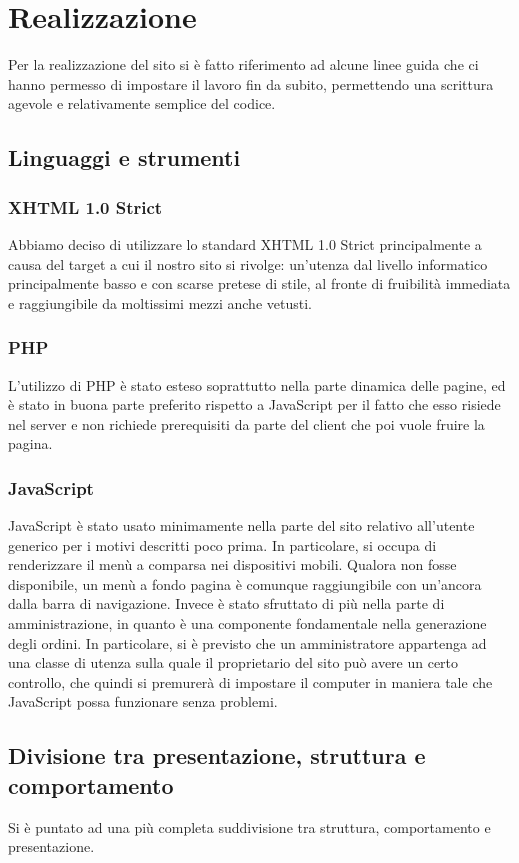 \newpage
\section{Realizzazione}
Per la realizzazione del sito si è fatto riferimento ad alcune linee guida che ci hanno permesso di impostare il lavoro fin da subito, permettendo una scrittura agevole e relativamente semplice del codice.
\subsection{Linguaggi e strumenti}
\subsubsection{XHTML 1.0 Strict}
Abbiamo deciso di utilizzare lo standard XHTML 1.0 Strict principalmente a causa del target a cui il nostro sito si rivolge: un'utenza dal livello informatico principalmente basso e con scarse pretese di stile, al fronte di fruibilità immediata e raggiungibile da moltissimi mezzi anche vetusti.
\subsubsection{PHP}
L'utilizzo di PHP è stato esteso soprattutto nella parte dinamica delle pagine, ed è stato in buona parte preferito rispetto a JavaScript per il fatto che esso risiede nel server e non richiede prerequisiti da parte del client che poi vuole fruire la pagina.
\subsubsection{JavaScript}
JavaScript è stato usato minimamente nella parte del sito relativo all'utente generico per i motivi descritti poco prima. In particolare, si occupa di renderizzare il menù a comparsa nei dispositivi mobili. Qualora non fosse disponibile, un menù a fondo pagina è comunque raggiungibile con un'ancora dalla barra di navigazione. Invece è stato sfruttato di più nella parte di amministrazione, in quanto è una componente fondamentale nella generazione degli ordini. In particolare, si è previsto che un amministratore appartenga ad una classe di utenza sulla quale il proprietario del sito può avere un certo controllo, che quindi si premurerà di impostare il computer in maniera tale che JavaScript possa funzionare senza problemi.
\subsection{Divisione tra presentazione, struttura e comportamento}
Si è puntato ad una più completa suddivisione tra struttura, comportamento e presentazione.
